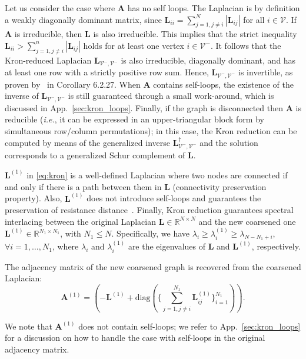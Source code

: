 \documentclass[journal]{IEEEtran}
\def\A{{\mathbf A}}
\def\L{{\mathbf L}}
\begin{document}
Let us consider the case where $\A$ has no self loops.
The Laplacian is by definition a weakly diagonally dominant matrix, since $\L_{ii} = \sum_{j=1, j \neq i}^N |\L_{ij}|$ for all $i \in \mathcal{V}$. 
If $\A$ is irreducible, then $\L$ is also irreducible. 
This implies that the strict inequality $\L_{ii} > \sum_{j=1, j \neq i}^n |\L_{ij}|$ holds for at least one vertex $i \in \mathcal{V}^{-}$. 
It follows that the Kron-reduced Laplacian $\L_{\mathcal{V}^{-},\mathcal{V}^{-}}$ is also irreducible, diagonally dominant, and has at least one row with a strictly positive row sum. Hence, $\L_{\mathcal{V}^{-},\mathcal{V}^{-}}$ is invertible, as proven by~\cite{horn2012matrix} in Corollary 6.2.27.
When $\A$ contains self-loops, the existence of the inverse of $\L_{\mathcal{V}^{-}, \mathcal{V}^{-}}$ is still guaranteed through a small work-around, which is discussed in App.~\ref{sec:kron_loops}.
Finally, if the graph is disconnected then $\A$ is reducible (\textit{i.e.}, it can be expressed in an upper-triangular block form by simultaneous row/column permutations); in this case, the Kron reduction can be computed by means of the generalized inverse $\L_{\mathcal{V}^{-}, \mathcal{V}^{-}}^\dagger$ and the solution corresponds to a generalized Schur complement of $\L$.

$\L^{(1)}$ in \eqref{eq:kron} is a well-defined Laplacian where two nodes are connected if and only if there is a path between them in $\L$ (connectivity preservation property). 
Also, $\L^{(1)}$ does not introduce self-loops and guarantees the preservation of resistance distance~\cite{shuman2016multiscale}.
Finally, Kron reduction guarantees spectral interlacing between the original Laplacian $\mathbf{L} \in \mathbb{R}^{N \times N}$ and the new coarsened one $\L^{(1)} \in \mathbb{R}^{N_1 \times N_1}$, with $N_1 \leq N$.
Specifically, we have $\lambda_i \geq \lambda^{(1)}_i \geq \lambda_{N-N_1+i}$, $\forall i=1, \dots, N_1$, where $\lambda_i$ and $\lambda^{(1)}_i$ are the eigenvalues of $\L$ and $\L^{(1)}$, respectively.

The adjacency matrix of the new coarsened graph is recovered from the coarsened Laplacian: 
\begin{equation}
    \A^{(1)} = \left( -\L^{(1)} + \text{diag}(\{ \sum_{j=1, j\neq i}^{N_1} \L^{(1)}_{ij}\}_{i=1}^{N_1}) \right).    
\end{equation}

We note that $\A^{(1)}$ does not contain self-loops;
we refer to App.~\ref{sec:kron_loops} for a discussion on how to handle the case with self-loops in the original adjacency matrix.
\end{document}
